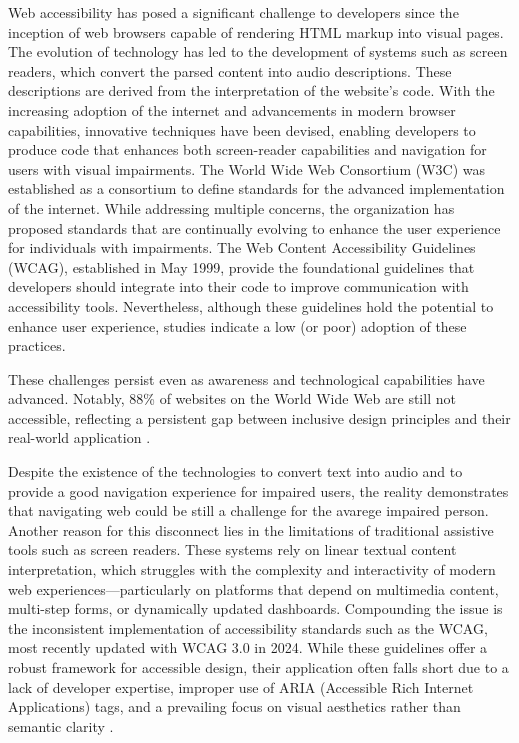 \documentclass[conference]{IEEEtran}
\begin{document}
Web accessibility has posed a significant challenge to developers since the inception of web browsers capable of rendering HTML markup into visual pages. The evolution of technology has led to the development of systems such as screen readers, which convert the parsed content into audio descriptions. These descriptions are derived from the interpretation of the website's code. With the increasing adoption of the internet and advancements in modern browser capabilities, innovative techniques have been devised, enabling developers to produce code that enhances both screen-reader capabilities and navigation for users with visual impairments. The World Wide Web Consortium (W3C) was established as a consortium to define standards for the advanced implementation of the internet. While addressing multiple concerns, the organization has proposed standards that are continually evolving to enhance the user experience for individuals with impairments. The Web Content Accessibility Guidelines (WCAG), established in May 1999, provide the foundational guidelines that developers should integrate into their code to improve communication with accessibility tools. Nevertheless, although these guidelines hold the potential to enhance user experience, studies indicate a low (or poor) adoption of these practices. \cite{abuaddous2016web, antonelli2018survey} 

These challenges persist even as awareness and technological capabilities have advanced. Notably, 88\% of websites on the World Wide Web are still not accessible, reflecting a persistent gap between inclusive design principles and their real-world application \cite{webaccess2024, martins2024large}.

Despite the existence of the technologies to convert text into audio and to provide a good navigation experience for impaired users, the reality demonstrates that navigating web could be still a challenge for the avarege impaired person. Another reason for this disconnect lies in the limitations of traditional assistive tools such as screen readers. These systems rely on linear textual content interpretation, which struggles with the complexity and interactivity of modern web experiences—particularly on platforms that depend on multimedia content, multi-step forms, or dynamically updated dashboards. Compounding the issue is the inconsistent implementation of accessibility standards such as the WCAG, most recently updated with WCAG 3.0 in 2024. While these guidelines offer a robust framework for accessible design, their application often falls short due to a lack of developer expertise, improper use of ARIA (Accessible Rich Internet Applications) tags, and a prevailing focus on visual aesthetics rather than semantic clarity \cite{gbd2021, wcagchallenges2025}.
\end{document}
